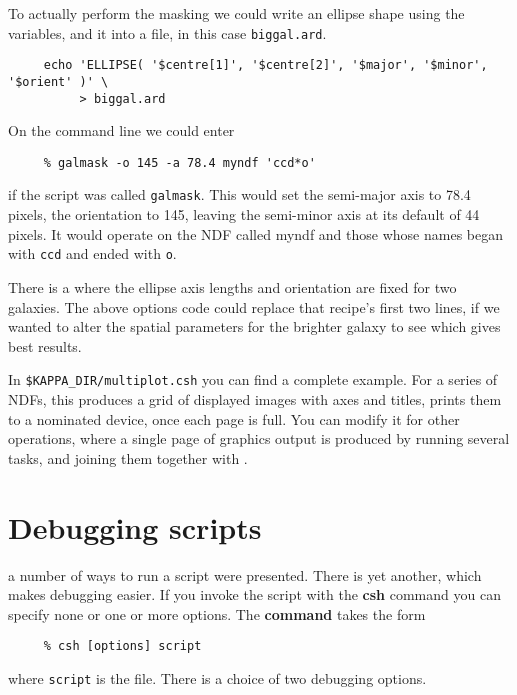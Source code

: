 To actually perform the masking we could write an  ellipse shape using the variables, and 
 it into a
file, in this case {\tt biggal.ard}.

\small
\begin{verbatim}
     echo 'ELLIPSE( '$centre[1]', '$centre[2]', '$major', '$minor', '$orient' )' \
          > biggal.ard
\end{verbatim}
\normalsize

On the command line we could enter

\small
\begin{verbatim}
     % galmask -o 145 -a 78.4 myndf 'ccd*o'
\end{verbatim}
\normalsize
if the script was called {\tt galmask}.  This would set the semi-major
axis to 78.4 pixels, the orientation to 145\dgs, leaving the
semi-minor axis at its default of 44 pixels.  It would operate on
the NDF called myndf and those whose names began with {\tt ccd} and
ended with {\tt o}.

There is a  \latexonly{in
Section~\ref{sc4_se_long1}} where the ellipse axis lengths and
orientation are fixed for two galaxies.  The above options code could
replace that recipe's first two lines, if we wanted to alter the
spatial parameters for the brighter galaxy to see which gives best
results.

In {\tt \$KAPPA\_DIR/multiplot.csh} you can find a complete example.
For a series of NDFs, this produces a grid of displayed images with
axes and titles, prints them to a nominated device, once each page is
full.  You can modify it for other operations, where a single page of
graphics output is produced by running several tasks, and joining them
together with \PSMERGEref\latexonly{ (SUN/164)}.

\newpage
\section{Debugging scripts
\label{sc4_se_debugging}}

  a number of ways to run a
script were presented.  There is yet another, which makes debugging
easier.  If you invoke the script with the {\bf csh} command you can
specify none or one or more options.  The {\bf command} takes the form

\small
\begin{verbatim}
     % csh [options] script
\end{verbatim}
\normalsize
where {\tt script} is the file.  There is a choice of two debugging
options.

